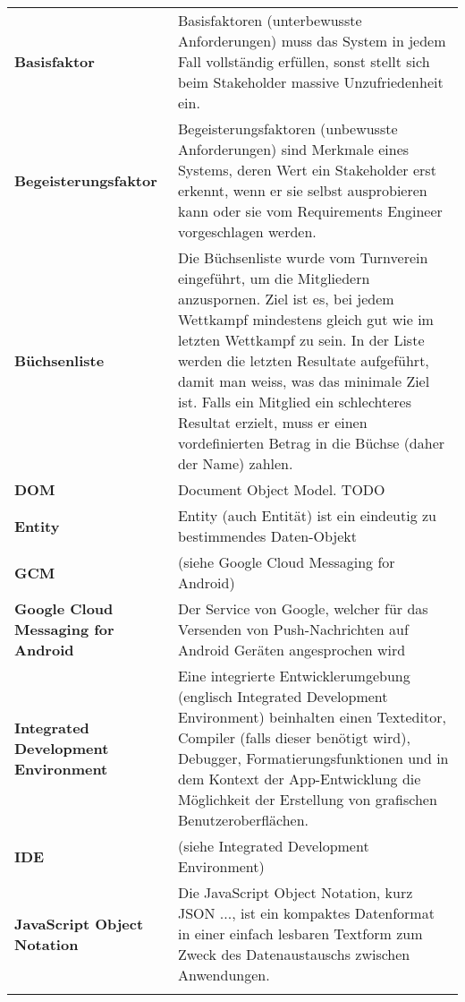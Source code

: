\begin{longtable}{>{\raggedright}m{3cm}m{11cm}}
	\textbf{Basisfaktor}&
	Basisfaktoren (unterbewusste Anforderungen) muss das System in jedem Fall vollständig erfüllen, sonst stellt sich beim Stakeholder massive Unzufriedenheit ein. \cite{req_eng_book}\\ \addlinespace

	\textbf{Begeisterungsfaktor}&
	Begeisterungsfaktoren (unbewusste Anforderungen) sind Merkmale eines Systems, deren Wert ein Stakeholder erst erkennt, wenn er sie selbst ausprobieren kann oder sie vom Requirements Engineer vorgeschlagen werden.\cite{req_eng_book}\\ \addlinespace

	\textbf{Büchsenliste}&
	Die Büchsenliste wurde vom Turnverein eingeführt, um die Mitgliedern anzuspornen. Ziel ist es, bei jedem Wettkampf mindestens gleich gut wie im letzten Wettkampf zu sein. In der Liste werden die letzten Resultate aufgeführt, damit man weiss, was das minimale Ziel ist. Falls ein Mitglied ein schlechteres Resultat erzielt, muss er einen vordefinierten Betrag in die Büchse (daher der Name) zahlen.\\ \addlinespace

	\textbf{DOM}&
	Document Object Model. TODO \\ \addlinespace

	\textbf{Entity}&
	Entity (auch Entität) ist ein eindeutig zu bestimmendes Daten-Objekt \\ \addlinespace

	\textbf{GCM}&
	(siehe Google Cloud Messaging for Android)\\ \addlinespace

	\textbf{Google Cloud Messaging for Android}&
	Der Service von Google, welcher für das Versenden von Push-Nachrichten auf Android Geräten angesprochen wird\\ \addlinespace

	\textbf{Integrated Development Environment}&
	Eine integrierte Entwicklerumgebung (englisch Integrated Development Environment) beinhalten einen Texteditor, Compiler (falls dieser benötigt wird), Debugger, Formatierungsfunktionen und in dem Kontext der App-Entwicklung die Möglichkeit der Erstellung von grafischen Benutzeroberflächen.\\ \addlinespace

	\textbf{IDE}&
	(siehe Integrated Development Environment)\\ \addlinespace

	\textbf{JavaScript Object Notation}&
	Die JavaScript Object Notation, kurz JSON ..., ist ein kompaktes Datenformat in einer einfach lesbaren Textform zum Zweck des Datenaustauschs zwischen Anwendungen.\cite{wiki_json}\\ \addlinespace


\end{longtable}
